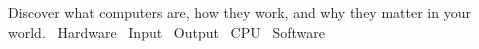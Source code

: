
  {Discover what computers are, how they work, and why they matter in your world.}
  {\faDesktop\ Hardware \quad \faKeyboard\ Input \quad \faTv\ Output \quad \faMicrochip\ CPU \quad \faCode\ Software}

